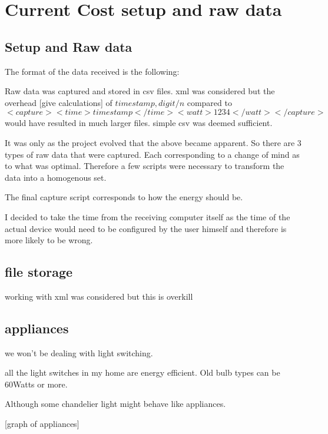 \chapter{Current Cost setup and raw data}

\section{Setup and Raw data}

The format of the data received is the following:


Raw data was captured and stored in csv files. xml was considered but the overhead [give calculations] of $timestamp,digit/n$ compared to $<capture><time>timestamp</time><watt>1234</watt></capture>$ would have resulted in much larger files. simple csv was deemed sufficient.

It was only as the project evolved that the above became apparent. So there are 3 types of raw data that were captured. Each corresponding to a change of mind as to what was optimal. Therefore a few scripts were necessary to transform the data into a homogenous set.

The final capture script corresponds to how the energy should be.

I decided to take the time from the receiving computer itself as the time of the actual device would need to be configured by the user himself and therefore is more likely to be wrong.


\section{file storage}

working with xml was considered but this is overkill

\section{appliances}

we won't be dealing with light switching.

all the light switches in my home are energy efficient. Old bulb types can be 60Watts or more.

Although some chandelier light might behave like appliances.

[graph of appliances]